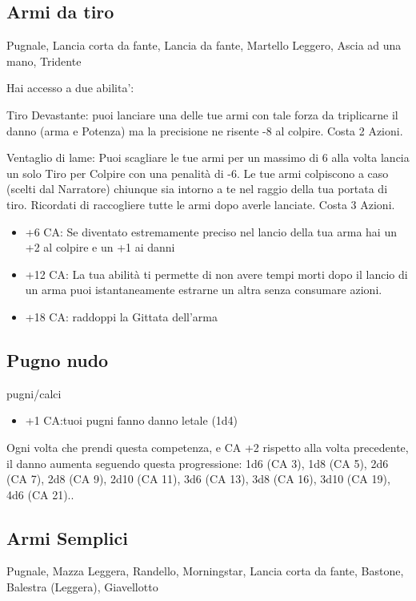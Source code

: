 \documentclass[a4paper,11pt,twoside,openany]{book}
\begin{document}
\subsection{Armi da tiro} Pugnale, Lancia corta da fante, Lancia da fante, Martello Leggero, Ascia ad una mano, Tridente

Hai accesso a due abilita':

Tiro Devastante: puoi lanciare una delle tue armi con tale forza da triplicarne il danno (arma e Potenza) ma la precisione ne risente -8 al colpire. Costa 2 Azioni.

Ventaglio di lame: Puoi scagliare le tue armi per un massimo di 6 alla volta lancia un solo Tiro per Colpire con una penalità di -6. Le tue armi colpiscono a caso (scelti dal Narratore) chiunque sia intorno a te nel raggio della tua portata di tiro. Ricordati di raccogliere tutte le armi dopo averle lanciate. Costa 3 Azioni.

\begin{itemize}
	\item +6 CA: Se diventato estremamente preciso nel lancio della tua arma hai un +2 al colpire e un +1 ai danni

	\item +12 CA: La tua abilità ti permette di non avere tempi morti dopo il lancio di un arma puoi istantaneamente estrarne un altra senza consumare azioni.

	\item +18 CA: raddoppi la Gittata dell'arma
\end{itemize}

\subsection{Pugno nudo} pugni/calci

\begin{itemize}
	\item +1 CA:tuoi pugni fanno danno letale (1d4)
\end{itemize}

Ogni volta che prendi questa competenza, e CA +2 rispetto alla volta precedente, il danno aumenta seguendo questa progressione: 1d6 (CA 3), 1d8 (CA 5), 2d6 (CA 7), 2d8 (CA 9), 2d10 (CA 11), 3d6 (CA 13), 3d8 (CA 16), 3d10 (CA 19), 4d6 (CA 21)..

\subsection{Armi Semplici} Pugnale, Mazza Leggera, Randello, Morningstar, Lancia corta da fante, Bastone, Balestra (Leggera), Giavellotto
\end{document}
